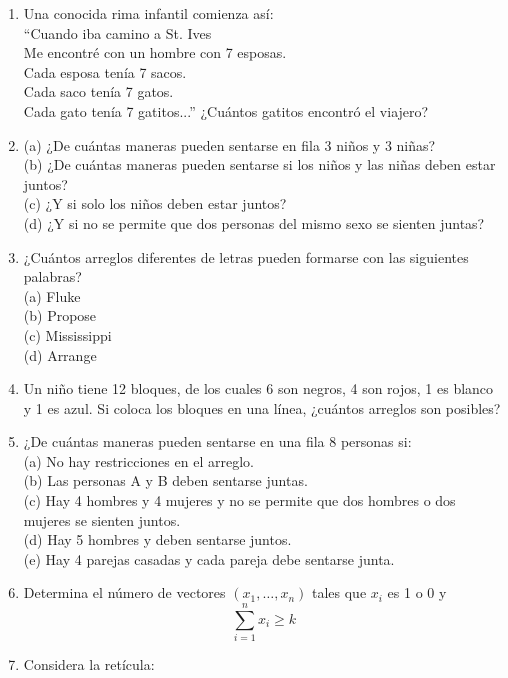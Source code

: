\documentclass{article}
\begin{document}
\begin{enumerate}
    \item Una conocida rima infantil comienza así: \\
          ``Cuando iba camino a St. Ives \\
          Me encontré con un hombre con 7 esposas. \\
          Cada esposa tenía 7 sacos. \\
          Cada saco tenía 7 gatos. \\
          Cada gato tenía 7 gatitos...''
          ¿Cuántos gatitos encontró el viajero?

    \item (a) ¿De cuántas maneras pueden sentarse en fila 3 niños y 3 niñas? \\
          (b) ¿De cuántas maneras pueden sentarse si los niños y las niñas deben estar juntos? \\
          (c) ¿Y si solo los niños deben estar juntos? \\
          (d) ¿Y si no se permite que dos personas del mismo sexo se sienten juntas?

    \item ¿Cuántos arreglos diferentes de letras pueden formarse con las siguientes palabras? \\
          (a) Fluke \\
          (b) Propose \\
          (c) Mississippi \\
          (d) Arrange

    \item Un niño tiene 12 bloques, de los cuales 6 son negros, 4 son rojos, 1 es blanco y 1 es azul. Si coloca los bloques en una línea, ¿cuántos arreglos son posibles?

    \item ¿De cuántas maneras pueden sentarse en una fila 8 personas si: \\
          (a) No hay restricciones en el arreglo. \\
          (b) Las personas A y B deben sentarse juntas. \\
          (c) Hay 4 hombres y 4 mujeres y no se permite que dos hombres o dos mujeres se sienten juntos. \\
          (d) Hay 5 hombres y deben sentarse juntos. \\
          (e) Hay 4 parejas casadas y cada pareja debe sentarse junta.
          
		\item Determina el número de vectores $(x_1, \ldots, x_n)$ tales que $x_i$ es 1 o 0 y
		$$
		\sum_{i=1}^n x_i\geq k
		$$
		\item Considera la retícula:
		\begin{center}
			\begin{tikzpicture}


\end{tikzpicture}
\end{center}
\end{enumerate}
\end{document}
